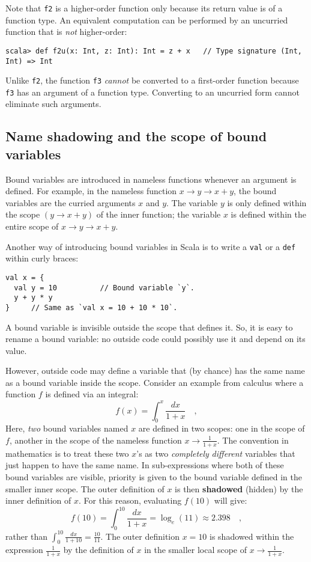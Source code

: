 Note that \texttt{}\lstinline!f2! is a higher-order function only
because its return value is of a function type. An equivalent computation
can be performed by an uncurried function that is \emph{not} higher-order:
\begin{lstlisting}
scala> def f2u(x: Int, z: Int): Int = z + x   // Type signature (Int, Int) => Int
\end{lstlisting}
Unlike \lstinline!f2!, the function \lstinline!f3! \emph{cannot}
be converted to a first-order function because \lstinline!f3! has
an argument of a function type. Converting to an uncurried form cannot
eliminate such arguments.

\subsection{Name shadowing and the scope of bound variables}

Bound variables are introduced in nameless functions whenever an argument
is defined. For example, in the nameless function $x\rightarrow y\rightarrow x+y$,
the bound variables are the curried arguments $x$ and $y$. The variable
$y$ is only defined within the scope $\left(y\rightarrow x+y\right)$
of the inner function; the variable $x$ is defined within the entire
scope of $x\rightarrow y\rightarrow x+y$.

Another way of introducing bound variables in Scala is to write a
\lstinline!val! or a \lstinline!def! within curly braces:
\begin{lstlisting}
val x = {
  val y = 10          // Bound variable `y`.
  y + y * y
}     // Same as `val x = 10 + 10 * 10`.
\end{lstlisting}

A bound variable is invisible outside the scope that defines it. So,
it is easy to rename a bound variable: no outside code could possibly
use it and depend on its value.

However, outside code may define a variable that (by chance) has the
same name as a bound variable inside the scope. Consider an example
from calculus where a function $f$ is defined via an integral:
\[
f(x)=\int_{0}^{x}\frac{dx}{1+x}\quad,
\]
Here, \emph{two} bound variables named $x$ are defined in two scopes:
one in the scope of $f$, another in the scope of the nameless function
$x\rightarrow\frac{1}{1+x}$. The convention in mathematics is to
treat these two $x$\textsf{'}s as two \emph{completely} \emph{different} variables
that just happen to have the same name. In sub-expressions where both
of these bound variables are visible, priority is given to the bound
variable defined in the smaller inner scope. The outer definition
of $x$ is then \textbf{shadowed} (hidden) by
the inner definition of $x$. For this reason, evaluating $f(10)$
will give:
\[
f(10)=\int_{0}^{10}\frac{dx}{1+x}=\log_{e}(11)\approx2.398\quad,
\]
rather than $\int_{0}^{10}\frac{dx}{1+10}=\frac{10}{11}$. The outer
definition $x=10$ is shadowed within the expression $\frac{1}{1+x}$
by the definition of $x$ in the smaller local scope of $x\rightarrow\frac{1}{1+x}$.


